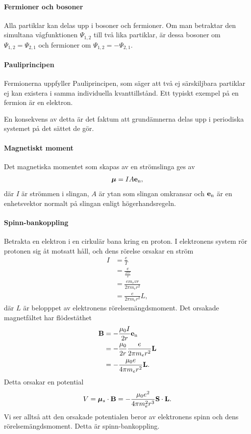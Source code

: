 \paragraph{Fermioner och bosoner}
Alla partiklar kan delas upp i bosoner och fermioner. Om man betraktar den simultana vågfunktionen $\Psi_{1, 2}$ till två lika partiklar, är dessa bosoner om $\Psi_{1, 2} = \Psi_{2, 1}$ och fermioner om $\Psi_{1, 2} = -\Psi_{2, 1}$.

\paragraph{Pauliprincipen}
Fermionerna uppfyller Pauliprincipen, som säger att två ej särskiljbara partiklar ej kan existera i samma individuella kvanttillstånd. Ett typiskt exempel på en fermion är en elektron.

En konsekvens av detta är det faktum att grundämnerna delas upp i periodiska systemet på det sättet de gör.

\paragraph{Magnetiskt moment}
Det magnetiska momentet som skapas av en strömslinga ges av
\begin{align*}
	\vb{\bm{\mu}} = IA\vb{e}_{\text{n}},
\end{align*}
där $I$ är strömmen i slingan, $A$ är ytan som slingan omkransar och $\vb{e}_{\text{n}}$ är en enhetsvektor normalt på slingan enligt högerhandsregeln.

\paragraph{Spinn-bankoppling}
Betrakta en elektron i en cirkulär bana kring en proton. I elektronens system rör protonen sig åt motsatt håll, och dens rörelse orsakar en ström
\begin{align*}
	I &= \frac{e}{T} \\
	  &= \frac{e}{\frac{2\pi r}{v}} \\
	  &= \frac{em_{e}vr}{2\pi m_{e}r^{2}} \\
	  &= \frac{e}{2\pi m_{e}r^{2}}L,
\end{align*}
där $L$ är belopppet av elektronens rörelsemängdsmoment. Det orsakade magnetfältet har flödestäthet
\begin{align*}
	\vb{B} &= -\frac{\mu_{0} I}{2r}\vb{e}_{\text{n}} \\
	       &= -\frac{\mu_{0}}{2r}\frac{e}{2\pi m_{e}r^{2}}\vb{L} \\
	       &= -\frac{\mu_{0}e}{4\pi m_{e}r^{2}}\vb{L}.
\end{align*}
Detta orsakar en potential
\begin{align*}
	V = \vb{\bm{\mu}}_{s}\cdot\vb{B} = -\frac{\mu_{0}e^{2}}{4\pi m_{e}^{2}r^{3}}\vb{S}\cdot\vb{L}.
\end{align*}
Vi ser alltså att den orsakade potentialen beror av elektronens spinn och dens rörelsemängdsmoment. Detta är spinn-bankoppling.

